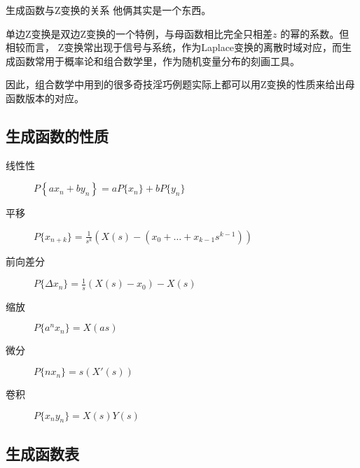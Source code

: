 \begin{note}{生成函数与Z变换的关系}
    他俩其实是一个东西。

    单边Z变换是双边Z变换的一个特例，与母函数相比完全只相差\(z\) 的幂的系数。但相较而言，
    Z变换常出现于信号与系统，作为Laplace变换的离散时域对应，而生成函数常用于概率论和组合数学里，作为随机变量分布的刻画工具。

    因此，组合数学中用到的很多奇技淫巧例题实际上都可以用Z变换的性质来给出母函数版本的对应。
\end{note}

\subsection{生成函数的性质}

\begin{description}
    \item[线性性] \(P\left\{ a x_{n}+b y_{n} \right\} = a
        P\{x_{n}\} + b P\{y_{n}\}\)
    \item[平移] \(P\{x_{n+k}\} = \frac{1}{s^{k}}
            \left( X(s) -
        (x_{0} +\dots +x_{k-1}s^{k-1} ) \right)\)
    \item[前向差分] \(P\{\Delta x_{n}\} = \frac{1}{s} \left(
        X(s)-x_{0} \right)- X(s)\)
    \item[缩放] \(P\{a^{n} x_{n}\} = X(as)\)
    \item[微分] \(P\{n x_{n}\} = s(X'(s))\)
    \item[卷积] \(P\{x_{n}y_{n}\} = X(s)Y(s)\)
\end{description}
\subsection{生成函数表}

